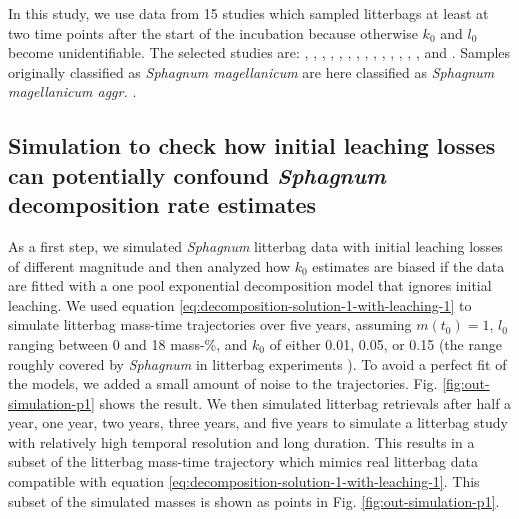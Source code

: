 \documentclass[bg, manuscript]{copernicus}
\begin{document}
In this study, we use data from 15 studies which sampled litterbags at least at two time points after the start of the incubation because otherwise \(k_0\) and \(l_0\) become unidentifiable. The selected studies are: \citet{Bartsch.1985}, \citet{Vitt.1990}, \citet{Johnson.1991}, \citet{Szumigalski.1996}, \citet{Prevost.1997}, \citet{Scheffer.2001}, \citet{Thormann.2001}, \citet{Asada.2005b}, \citet{Trinder.2008}, \citet{Breeuwer.2008}, \citet{Strakova.2010}, \citet{Hagemann.2015}, \citet{Bengtsson.2017}, \citet{Golovatskaya.2017}, and \citet{Makila.2018}. Samples originally classified as \emph{Sphagnum magellanicum} are here classified as \emph{Sphagnum magellanicum aggr.} \citep{Hassel.2018}.

\subsection{\texorpdfstring{Simulation to check how initial leaching losses can potentially confound \emph{Sphagnum} decomposition rate estimates}{Simulation to check how initial leaching losses can potentially confound Sphagnum decomposition rate estimates}}

As a first step, we simulated \emph{Sphagnum} litterbag data with initial leaching losses of different magnitude and then analyzed how \(k_0\) estimates are biased if the data are fitted with a one pool exponential decomposition model that ignores initial leaching. We used equation \eqref{eq:decomposition-solution-1-with-leaching-1} to simulate litterbag mass-time trajectories over five years, assuming \(m(t_0)=1\), \(l_0\) ranging between 0 and 18 mass-\%, and \(k_0\) of either 0.01, 0.05, or 0.15 (the range roughly covered by \emph{Sphagnum} in litterbag experiments \citep[e.g.,][]{Moore.2007, Turetsky.2008}). To avoid a perfect fit of the models, we added a small amount of noise to the trajectories. Fig. \ref{fig:out-simulation-p1} shows the result. We then simulated litterbag retrievals after half a year, one year, two years, three years, and five years to simulate a litterbag study with relatively high temporal resolution and long duration. This results in a subset of the litterbag mass-time trajectory which mimics real litterbag data compatible with equation \eqref{eq:decomposition-solution-1-with-leaching-1}. This subset of the simulated masses is shown as points in Fig. \ref{fig:out-simulation-p1}.
\end{document}
